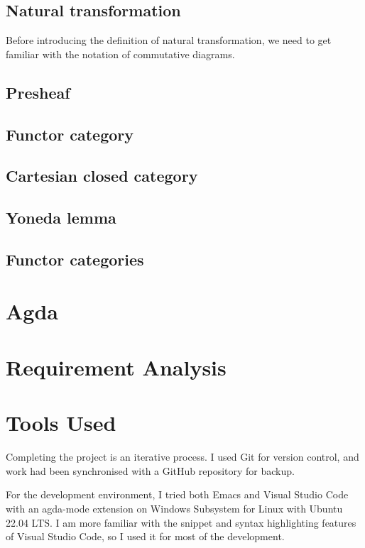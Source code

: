 \documentclass[12pt,twoside,a4paper]{report}
\theoremstyle{definition}
\begin{document}
        \subsection{Natural transformation}
        Before introducing the definition of natural transformation, we need to get familiar with the notation of commutative diagrams.


        \subsection{Presheaf}

        \subsection{Functor category}

        \subsection{Cartesian closed category}

        \subsection{Yoneda lemma}

        \subsection{Functor categories}

    \section{Agda}

    \section{Requirement Analysis}

    \section{Tools Used}
    Completing the project is an iterative process. I used Git \cite{git} for version control, and work had been synchronised with a GitHub \cite{github} repository for backup.

    For the development environment, I tried both Emacs \cite{emacs} and Visual Studio Code \cite{vscode} with an agda-mode extension \cite{agda_mode} on Windows Subsystem for Linux with Ubuntu \cite{wsl_ubuntu} 22.04 LTS. I am more familiar with the snippet and syntax highlighting features of Visual Studio Code, so I used it for most of the development. 
    
\end{document}

